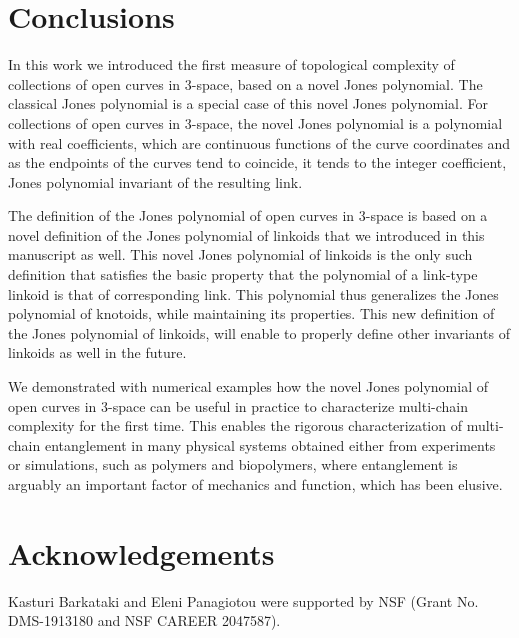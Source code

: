 \documentclass{article}
\begin{document}
\section{Conclusions}
\label{conclusion}

In this work we introduced the first measure of topological complexity of collections of open curves in 3-space, based on a novel Jones polynomial. The classical Jones polynomial is a special case of this novel Jones polynomial. For collections of open curves in 3-space, the novel Jones polynomial is a polynomial with real coefficients, which are continuous functions of the curve coordinates and as the endpoints of the curves tend to coincide, it tends to the integer coefficient, Jones polynomial invariant of the resulting link.

The definition of the Jones polynomial of open curves in 3-space is based on a novel definition of the Jones polynomial of linkoids that we introduced in this manuscript as well. This novel Jones polynomial of linkoids is the only such definition that satisfies the basic property that the polynomial of a link-type linkoid is that of corresponding link. This polynomial thus generalizes the Jones polynomial of knotoids, while maintaining its properties. This new definition of the Jones polynomial of linkoids, will enable to properly define other invariants of linkoids as well in the future.

We demonstrated with numerical examples how the novel Jones polynomial of open curves in 3-space can be useful in practice to characterize multi-chain complexity for the first time. This enables the rigorous characterization of multi-chain entanglement in many physical systems obtained either from experiments or simulations, such as polymers and biopolymers, where entanglement is arguably an important factor of mechanics and function, which has been elusive.



\section{Acknowledgements}
 Kasturi Barkataki and Eleni Panagiotou were supported by NSF (Grant No. DMS-1913180 and NSF CAREER 2047587).



\end{document}
